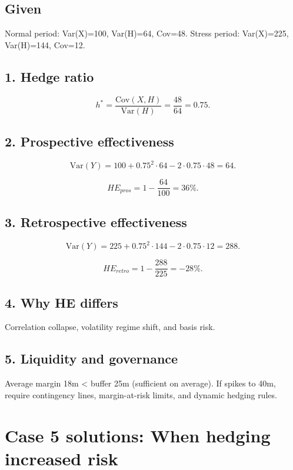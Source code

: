 \documentclass[11pt]{article}
\begin{document}
\subsection*{Given}
Normal period: Var(X)=100, Var(H)=64, Cov=48. Stress period: Var(X)=225, Var(H)=144, Cov=12.

\subsection*{1. Hedge ratio}


\[
h^* = \frac{\mathrm{Cov}(X,H)}{\mathrm{Var}(H)} = \frac{48}{64} = 0.75.
\]



\subsection*{2. Prospective effectiveness}


\[
\mathrm{Var}(Y) = 100 + 0.75^2 \cdot 64 - 2\cdot 0.75 \cdot 48 = 64.
\]




\[
HE_{pros} = 1 - \frac{64}{100} = 36\%.
\]



\subsection*{3. Retrospective effectiveness}


\[
\mathrm{Var}(Y) = 225 + 0.75^2 \cdot 144 - 2\cdot 0.75 \cdot 12 = 288.
\]




\[
HE_{retro} = 1 - \frac{288}{225} = -28\%.
\]



\subsection*{4. Why HE differs}
Correlation collapse, volatility regime shift, and basis risk.

\subsection*{5. Liquidity and governance}
Average margin 18m < buffer 25m (sufficient on average). If spikes to 40m, require contingency lines, margin-at-risk limits, and dynamic hedging rules.

\newpage
\section{Case 5 solutions: When hedging increased risk}
\end{document}
